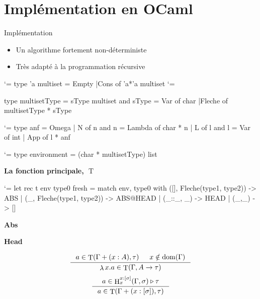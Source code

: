 \documentclass{beamer}
\newcommand\heading[1]{%
  \par\bigskip
  {\Large\bfseries#1}\par\smallskip}
\let\origlstlisting=\lstlisting
\let\endoriglstlisting=\endlstlisting
\renewenvironment{lstlisting}
{\mathcode`\-=\hyphenmathcode
    \everymath{}\mathsurround=0pt\origlstlisting}
{\endoriglstlisting}
\DeclareMathOperator{\iT}{T}
\DeclareMathOperator{\iH}{H}
\DeclareMathOperator{\iDom}{dom}
\DeclareMathOperator{\iLambda}{\lambda}
\begin{document}
    \section{Implémentation en OCaml}
    \begin{frame}[containsverbatim]{Implémentation}
        \begin{itemize}
            \item Un algorithme fortement non-déterministe
            \item Très adapté à la programmation récursive
        \end{itemize}
        
        \begin{multicols}{2}
        \begin{lstlisting}
type 'a multiset =
 Empty
|Cons of 'a*'a multiset
        \end{lstlisting}
\begin{lstlisting} %[caption={Intersection types and environments}]

type multisetType = 
 sType multiset 
and sType = 
 Var of char
|Fleche of multisetType
            * sType
\end{lstlisting}

        \vfill
        \columnbreak
        \begin{lstlisting}
type anf = 
    Omega
  | N of n
and n = 
    Lambda of char * n
  | L of l
and l =
    Var of int
  | App of l * anf
            \end{lstlisting}
            
        \end{multicols}
\begin{lstlisting}
type environment = (char * multisetType) list
\end{lstlisting}
    \end{frame}
    
    \begin{frame}[containsverbatim]
    \heading{La fonction principale, $\iT$}
    \begin{lstlisting}
let rec t env type0 fresh =
  match env, type0 with
      ([], Fleche(type1, type2)) -> ABS
    | (_, Fleche(type1, type2)) -> ABS@HEAD
    | (_::_, _) -> HEAD
  | (_,_) -> []
    \end{lstlisting}
    
    \begin{multicols}{2}
    \heading{Abs}
    \columnbreak
    \heading{Head}
    \end{multicols}
    \begin{multicols}{2}
    \small
    \begin{displaymath}
        \inference[]{a \in \iT(\Gamma + (x : A), \tau) & x \notin \iDom(\Gamma)}{\iLambda x.a \in \iT(\Gamma, A \rightarrow \tau)}
    \end{displaymath}
    \vfill
    \columnbreak
    \begin{displaymath}
        \inference[]{a \in \iH^{x:[\sigma]}_x(\Gamma, \sigma) \triangleright \tau}{a \in\iT(\Gamma + (x:[\sigma]), \tau) }
    \end{displaymath}
        \end{multicols}
        \normalsize
    \end{frame}
    
\end{document}
